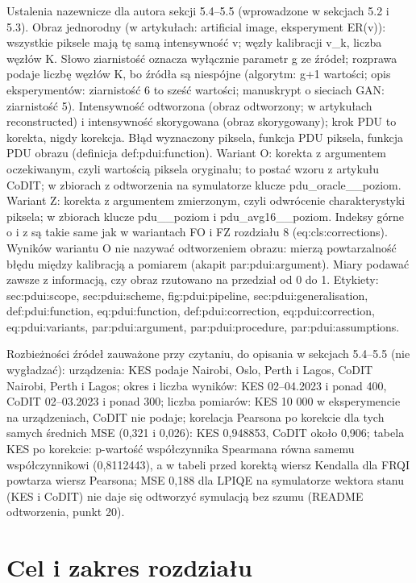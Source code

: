 {Ustalenia nazewnicze dla autora sekcji 5.4--5.5 (wprowadzone w sekcjach 5.2 i 5.3).
Obraz jednorodny (w artykułach: artificial image, eksperyment ER(v)): wszystkie piksele mają tę samą intensywność v; węzły kalibracji v_k, liczba węzłów K.
Słowo ziarnistość oznacza wyłącznie parametr g ze źródeł; rozprawa podaje liczbę węzłów K, bo źródła są niespójne (algorytm: g+1 wartości; opis eksperymentów: ziarnistość 6 to sześć wartości; manuskrypt o sieciach GAN: ziarnistość 5).
Intensywność odtworzona (obraz odtworzony; w artykułach reconstructed) i intensywność skorygowana (obraz skorygowany); krok PDU to korekta, nigdy korekcja.
Błąd wyznaczony piksela, funkcja PDU piksela, funkcja PDU obrazu (definicja def:pdui:function).
Wariant O: korekta z argumentem oczekiwanym, czyli wartością piksela oryginału; to postać wzoru z artykułu CoDIT; w zbiorach z odtworzenia na symulatorze klucze pdu_oracle__poziom.
Wariant Z: korekta z argumentem zmierzonym, czyli odwrócenie charakterystyki piksela; w zbiorach klucze pdu__poziom i pdu_avg16__poziom.
Indeksy górne o i z są takie same jak w wariantach FO i FZ rozdziału 8 (eq:cls:corrections).
Wyników wariantu O nie nazywać odtworzeniem obrazu: mierzą powtarzalność błędu między kalibracją a pomiarem (akapit par:pdui:argument).
Miary podawać zawsze z informacją, czy obraz rzutowano na przedział od 0 do 1.
Etykiety: sec:pdui:scope, sec:pdui:scheme, fig:pdui:pipeline, sec:pdui:generalisation, def:pdui:function, eq:pdui:function, def:pdui:correction, eq:pdui:correction, eq:pdui:variants, par:pdui:argument, par:pdui:procedure, par:pdui:assumptions.

Rozbieżności źródeł zauważone przy czytaniu, do opisania w sekcjach 5.4--5.5 (nie wygładzać):
urządzenia: KES podaje Nairobi, Oslo, Perth i Lagos, CoDIT Nairobi, Perth i Lagos;
okres i liczba wyników: KES 02--04.2023 i ponad 400, CoDIT 02--03.2023 i ponad 300;
liczba pomiarów: KES 10 000 w eksperymencie na urządzeniach, CoDIT nie podaje;
korelacja Pearsona po korekcie dla tych samych średnich MSE (0,321 i 0,026): KES 0,948853, CoDIT około 0,906;
tabela KES po korekcie: p-wartość współczynnika Spearmana równa samemu współczynnikowi (0,8112443), a w tabeli przed korektą wiersz Kendalla dla FRQI powtarza wiersz Pearsona;
MSE 0,188 dla LPIQE na symulatorze wektora stanu (KES i CoDIT) nie daje się odtworzyć symulacją bez szumu (README odtworzenia, punkt 20).
}

\section{Cel i zakres rozdziału}\label{sec:pdui:scope}

